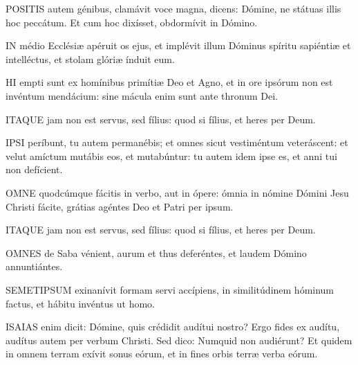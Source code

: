 
\lettrine[lines=2]{P}{OSITIS} autem génibus, clamávit voce magna, dicens: Dómine, ne státuas illis hoc peccátum. Et cum hoc dixísset, obdormívit in Dómino.


\lettrine[lines=2]{I}{N} médio Ecclésiæ apéruit os ejus, et implévit illum Dóminus spíritu sapiéntiæ et intelléctus, et stolam glóriæ índuit eum.


\lettrine[lines=2]{H}{I} empti sunt ex homínibus primítiæ Deo et Agno, et in ore ipsórum non est invéntum mendácium: sine mácula enim sunt ante thronum Dei.


\lettrine[lines=2]{I}{TAQUE} jam non est servus, sed fílius: quod si fílius, et heres per Deum.


\lettrine[lines=2]{I}{PSI} períbunt, tu autem permanébis; et omnes sicut vestiméntum veteráscent: et velut amíctum mutábis eos, et mutabúntur: tu autem idem ipse es, et anni tui non defícient.


\lettrine[lines=2]{O}{MNE} quodcúmque fácitis in verbo, aut in ópere: ómnia in nómine Dómini Jesu Christi fácite, grátias agéntes Deo et Patri per ipsum.


\lettrine[lines=2]{I}{TAQUE} jam non est servus, sed fílius: quod si fílius, et heres per Deum.


\lettrine[lines=2]{O}{MNES} de Saba vénient, aurum et thus deferéntes, et laudem Dómino annuntiántes.


\lettrine[lines=2]{S}{EMETIPSUM} exinanívit formam servi accípiens, in similitúdinem hóminum factus, et hábitu invéntus ut homo.

\sectionornament



\lettrine[lines=2]{I}{SAIAS} enim dicit: Dómine, quis crédidit audítui nostro? Ergo fides ex audítu, audítus autem per verbum Christi. Sed dico: Numquid non audiérunt? Et quidem in omnem terram exívit sonus eórum, et in fines orbis terræ verba eórum.

